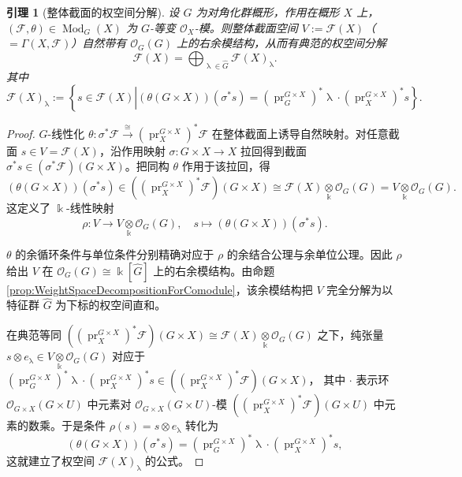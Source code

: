 \documentclass[11pt,a4paper]{article}
\DeclareMathOperator{\Mod}{\mathrm{Mod}}
\DeclareMathOperator{\field}{\mathbb{k}}
\DeclareMathOperator{\pr}{\operatorname{pr}}
\DeclareMathOperator{\cha}{\lambda}
\theoremstyle{cnth}
\newtheorem{lemma}[thm]{引理}
\begin{document}
\begin{lemma}[整体截面的权空间分解]
\label{lem:GlobalSectionDecomposition}
设 $G$ 为对角化群概形，作用在概形 $X$ 上，$(\mathcal{F}, \theta) \in \Mod_G(X)$ 为 $G$-等变 $\mathcal{O}_X$-模。则整体截面空间 $V := \mathcal{F}(X)$（$=\Gamma(X, \mathcal{F})$）自然带有 $\mathcal{O}_G(G)$ 上的右余模结构，从而有典范的权空间分解
$$
\mathcal{F}(X) = \bigoplus_{\cha \in \widehat{G}}
\mathcal{F}(X)_{\cha}.
$$
其中
$
\mathcal{F}(X)_{\cha}
:=
\left\{
s \in \mathcal{F}(X)
\left|
(\theta(G\times X))(\sigma^* s)
=
\left(\pr_G^{G \times X}\right)^*\cha
\cdot
\left(\pr_X^{G \times X}\right)^* s
\right.\right\}.
$
\end{lemma}

\begin{proof}
$G$-线性化 $\theta : \sigma^* \mathcal{F} \xrightarrow{\cong} \left(\pr_X^{G \times X}\right)^* \mathcal{F}$ 在整体截面上诱导自然映射。对任意截面 $s \in V = \mathcal{F}(X)$，沿作用映射 $\sigma:G\times X \rightarrow X$ 拉回得到截面 $\sigma^* s \in (\sigma^*\mathcal{F})(G\times X)$。把同构 $\theta$ 作用于该拉回，得
$$
(\theta(G\times X))(\sigma^* s)
\in
\left(\left(\pr_X^{G \times X}\right)^* \mathcal{F}\right)(G\times X)
\cong
\mathcal{F}(X) \underset{\field}{\otimes} \mathcal{O}_G(G)
=
V \underset{\field}{\otimes} \mathcal{O}_G(G).
$$
这定义了 $\field$-线性映射
$$
\rho
:
V \rightarrow V \underset{\field}{\otimes} \mathcal{O}_G(G),
\quad
s
\mapsto
(\theta(G\times X))(\sigma^* s).
$$

$\theta$ 的余循环条件与单位条件分别精确对应于 $\rho$ 的余结合公理与余单位公理。因此 $\rho$ 给出 $V$ 在 $\mathcal{O}_G(G) \cong \field[\widehat{G}]$ 上的右余模结构。由命题 \ref{prop:WeightSpaceDecompositionForComodule}，该余模结构把 $V$ 完全分解为以特征群 $\widehat{G}$ 为下标的权空间直和。

在典范等同
$
\left(\left(\pr_X^{G \times X}\right)^* \mathcal{F}\right)(G\times X)
\cong
\mathcal{F}(X) \underset{\field}{\otimes} \mathcal{O}_G(G)
$
之下，纯张量 $s \otimes e_{\cha} \in V \underset{\field}{\otimes} \mathcal{O}_G(G)$ 对应于
$
\left(\pr_G^{G \times X}\right)^*\cha
\cdot
\left(\pr_X^{G \times X}\right)^* s
\in
\left(\left(\pr_X^{G \times X}\right)^* \mathcal{F}\right)(G\times X)
$，
其中 $\cdot$ 表示环 $\mathcal{O}_{G\times X}(G\times U)$ 中元素对 $\mathcal{O}_{G\times X}(G\times U)$-模
$\left(\left(\pr_X^{G \times X}\right)^*\mathcal{F}\right)(G\times U)$ 中元素的数乘。于是条件 $\rho(s) = s \otimes e_{\cha}$ 转化为
$$
(\theta(G\times X))(\sigma^* s) = \left(\pr_G^{G \times X}\right)^*\cha \cdot \left(\pr_X^{G \times X}\right)^* s,
$$
这就建立了权空间 $\mathcal{F}(X)_{\cha}$ 的公式。
\end{proof}
\end{document}
